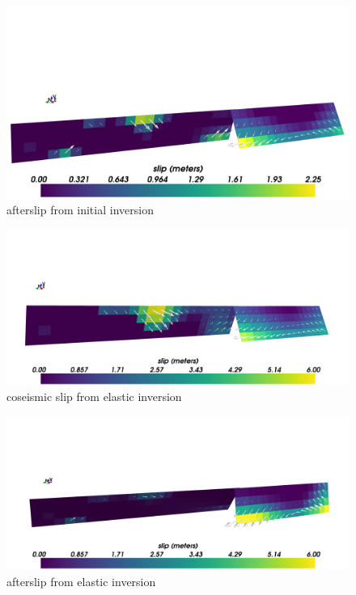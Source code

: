 \documentclass[12pt]{article}
\begin{document}
\begin{figure}
\includegraphics[scale=0.1]{Figures/initial_afterslip}
\centering 
\caption{afterslip from initial inversion}
\label{InitialAfterslip}
\end{figure} 

\begin{figure}
\includegraphics[scale=0.1]{Figures/initial_elastic_coseismic}
\centering 
\caption{coseismic slip from elastic inversion}
\label{InitialElasticCoseismic}
\end{figure} 

\begin{figure}
\includegraphics[scale=0.1]{Figures/initial_elastic_afterslip}
\centering 
\caption{afterslip from elastic inversion}
\label{FluidityLCurve}
\end{figure} 
\end{document}
